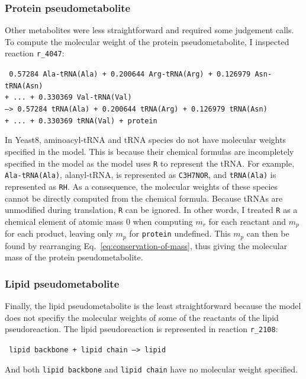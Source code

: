 \subsubsection{Protein pseudometabolite}
\label{subsubsec:model-yeast8-molweight-protein}

Other metabolites were less straightforward and required some judgement calls.
To compute the molecular weight of the protein pseudometabolite, I inspected reaction \texttt{r\_4047}:

\texttt{
  0.57284 Ala-tRNA(Ala) + 0.200644 Arg-tRNA(Arg) + 0.126979 Asn-tRNA(Asn)\\
  + ... + 0.330369 Val-tRNA(Val) \\
  --> 0.57284 tRNA(Ala) + 0.200644 tRNA(Arg) + 0.126979 tRNA(Asn) \\
  + ... + 0.330369 tRNA(Val) + protein
}

In Yeast8, aminoacyl-tRNA and tRNA species do not have molecular weights specified in the model.
This is because their chemical formulas are incompletely specified in the model as the model uses \texttt{R} to represent the tRNA.
For example, \texttt{Ala-tRNA(Ala)}, alanyl-tRNA, is represented as \texttt{C3H7NOR}, and \texttt{tRNA(Ala)} is represented as \texttt{RH}.
As a consequence, the molecular weights of these species cannot be directly computed from the chemical formula.
Because tRNAs are unmodified during translation, \texttt{R} can be ignored.
In other words, I treated \texttt{R} as a chemical element of atomic mass 0 when computing $m_{r}$ for each reactant and $m_{p}$ for each product, leaving only $m_{p}$ for \texttt{protein} undefined.
This $m_{p}$ can then be found by rearranging Eq.\ \ref{eq:conservation-of-mass}, thus giving the molecular mass of the protein pseudometabolite.


\subsubsection{Lipid pseudometabolite}
\label{subsubsec:model-yeast8-molweight-lipid}

Finally, the lipid pseudometabolite is the least straightforward because the model does not specifiy the molecular weights of some of the reactants of the lipid pseudoreaction.
The lipid pseudoreaction is represented in reaction \texttt{r\_2108}:

\texttt{
  lipid backbone + lipid chain --> lipid
}

And both \texttt{lipid backbone} and \texttt{lipid chain} have no molecular weight specified.

